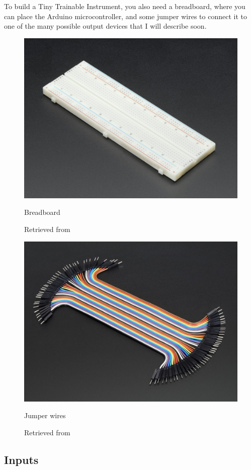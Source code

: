 To build a Tiny Trainable Instrument, you also need a breadboard, where you can place the Arduino microcontroller, and some jumper wires to connect it to one of the many possible output devices that I will describe soon.

\begin{figure}[ht]
  \centering
  \includegraphics[width=0.75\linewidth,height=0.25\textheight,keepaspectratio]{images/materials-adafruit-breadboard.jpg}
  \caption{Breadboard}
  \caption*{Retrieved from \cite{website-materials-adafruit-breadboard}}
  \label{fig:materials-adafruit-breadboard}
\end{figure}

\begin{figure}[ht]
  \centering
  \includegraphics[width=0.75\linewidth,height=0.25\textheight,keepaspectratio]{images/materials-adafruit-jumper-wires.jpg}
  \caption{Jumper wires}
  \caption*{Retrieved from \cite{website-materials-adafruit-jumper-wires}}
  \label{fig:materials-adafruit-jumper-wires}
\end{figure}

\subsection{Inputs}

